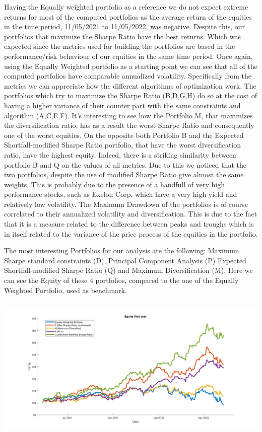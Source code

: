 \documentclass{assignment}
\begin{document}
Having the Equally weighted portfolio as a reference we do not expect extreme returns for most of the computed portfolios as the average return of the equities in the time period, 11/05/2021 to 11/05/2022, was negative. Despite this, our portfolios that maximize the Sharpe Ratio have the best returns. Which was expected since the metrics used for building the portfolios are based in the performance/risk behaviour of our equities in the same time period.
Once again, using the Equally Weighted portfolio as a starting point we can see that all of the computed portfolios have comparable annualized volatility.
Specifically from the metrics we can appreciate how the different algorithms of optimization work. The portfolios which try to maximize the Sharpe Ratio (B,D,G,H) do so at the cost of having a higher variance of their counter part with the same constraints and algorithm (A,C,E,F).
It's interesting to see how the Portfolio M, that maximizes the diversification ratio, has as a result the worst Sharpe Ratio and consequently one of the worst equities. On the opposite both Portfolio B and the Expected Shortfall-modified Sharpe Ratio portfolio, that have the worst diversification ratio, have the highest equity.
Indeed, there is a striking similarity between portfolio B and Q on the values of all metrics. Due to this we noticed that the two portfolios, despite the use of modified Sharpe Ratio give almost the same weights. This is probably due to the presence of a handfull of very high performance stocks, such as Exelon Corp, which have a very high yield and relatively low volatility.
The Maximum Drawdown of the portfolios is of course correlated to their annualized volatility and diversification. This is due to the fact that it is a measure related to the difference between peaks and troughs which is in itself related to the variance of the price process of the equities in the portfolio.

The most interesting Portfolios for our analysis are the following: Maximum Sharpe standard constraints (D), Principal Component Analysis (P) Expected Shortfall-modified Sharpe Ratio (Q) and Maximum Diversification (M). 
Here we can see the Equity of these 4 portfolios, compared to the one of the Equally Weighted Portfolio, used as benchmark.

\begin{center}
    \includegraphics[height=7cm]
    {assets/Equity1.png}
\end{center}
\end{document}
